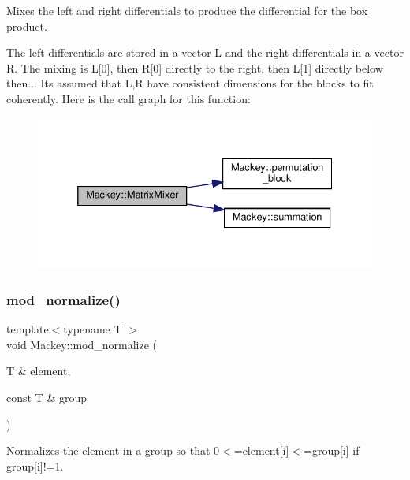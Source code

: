 Mixes the left and right differentials to produce the differential for the box product. 

The left differentials are stored in a vector L and the right differentials in a vector R. The mixing is L\mbox{[}0\mbox{]}, then R\mbox{[}0\mbox{]} directly to the right, then L\mbox{[}1\mbox{]} directly below then... It\textquotesingle{}s assumed that L,R have consistent dimensions for the blocks to fit coherently. Here is the call graph for this function\+:\nopagebreak
\begin{figure}[H]
\begin{center}
\leavevmode
\includegraphics[width=332pt]{namespaceMackey_a993f40280c4b6eae358e8c1bb4daa290_cgraph}
\end{center}
\end{figure}
\mbox{\label{namespaceMackey_a257bcf5aabab2d73fdb13a23cb975d93}} 
\subsubsection{\texorpdfstring{mod\+\_\+normalize()}{mod\_normalize()}}
{\footnotesize\ttfamily template$<$typename T $>$ \\
void Mackey\+::mod\+\_\+normalize (\begin{DoxyParamCaption}\item[{T \&}]{element,  }\item[{const T \&}]{group }\end{DoxyParamCaption})}



Normalizes the element in a group so that 0$<$=element\mbox{[}i\mbox{]}$<$=group\mbox{[}i\mbox{]} if group\mbox{[}i\mbox{]}!=1. 

